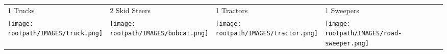 \begin{tabular}{m{}m{}m{}m{}}
    {\color{ccorange} 1 Trucks} & {\color{ccorange} 2 Skid Steers} & {\color{ccorange} 1 Tractors} & {\color{ccorange} 1 Sweepers} \\
    \texttt{[image: \\rootpath/IMAGES/truck.png]}  & \texttt{[image: \\rootpath/IMAGES/bobcat.png]} & \texttt{[image: \\rootpath/IMAGES/tractor.png]} & \texttt{[image: \\rootpath/IMAGES/road-sweeper.png]}                         
    \end{tabular}